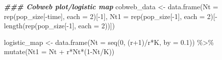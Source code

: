 \documentclass[
]{book}
\newenvironment{Shaded}{\begin{snugshade}}{\end{snugshade}}
\newcommand{\AttributeTok}[1]{\textcolor[rgb]{0.77,0.63,0.00}{#1}}
\newcommand{\DecValTok}[1]{\textcolor[rgb]{0.00,0.00,0.81}{#1}}
\newcommand{\DocumentationTok}[1]{\textcolor[rgb]{0.56,0.35,0.01}{\textbf{\textit{#1}}}}
\newcommand{\FloatTok}[1]{\textcolor[rgb]{0.00,0.00,0.81}{#1}}
\newcommand{\FunctionTok}[1]{\textcolor[rgb]{0.00,0.00,0.00}{#1}}
\newcommand{\NormalTok}[1]{#1}
\newcommand{\OtherTok}[1]{\textcolor[rgb]{0.56,0.35,0.01}{#1}}
\newcommand{\SpecialCharTok}[1]{\textcolor[rgb]{0.00,0.00,0.00}{#1}}
\begin{document}
\begin{Shaded}
\begin{Highlighting}[]
\DocumentationTok{\#\#\# Cobweb plot/logistic map}
\NormalTok{cobweb\_data }\OtherTok{\textless{}{-}} \FunctionTok{data.frame}\NormalTok{(}\AttributeTok{Nt =} \FunctionTok{rep}\NormalTok{(pop\_size[}\SpecialCharTok{{-}}\NormalTok{time], }\AttributeTok{each =} \DecValTok{2}\NormalTok{)[}\SpecialCharTok{{-}}\DecValTok{1}\NormalTok{], }
                          \AttributeTok{Nt1 =} \FunctionTok{rep}\NormalTok{(pop\_size[}\SpecialCharTok{{-}}\DecValTok{1}\NormalTok{], }\AttributeTok{each =} \DecValTok{2}\NormalTok{)[}\SpecialCharTok{{-}}\FunctionTok{length}\NormalTok{(}\FunctionTok{rep}\NormalTok{(pop\_size[}\SpecialCharTok{{-}}\DecValTok{1}\NormalTok{], }\AttributeTok{each =} \DecValTok{2}\NormalTok{))])}

\NormalTok{logistic\_map }\OtherTok{\textless{}{-}} \FunctionTok{data.frame}\NormalTok{(}\AttributeTok{Nt =} \FunctionTok{seq}\NormalTok{(}\DecValTok{0}\NormalTok{, (r}\SpecialCharTok{+}\DecValTok{1}\NormalTok{)}\SpecialCharTok{/}\NormalTok{r}\SpecialCharTok{*}\NormalTok{K, }\AttributeTok{by =} \FloatTok{0.1}\NormalTok{)) }\SpecialCharTok{\%\textgreater{}\%}
  \FunctionTok{mutate}\NormalTok{(}\AttributeTok{Nt1 =}\NormalTok{ Nt }\SpecialCharTok{+}\NormalTok{ r}\SpecialCharTok{*}\NormalTok{Nt}\SpecialCharTok{*}\NormalTok{(}\DecValTok{1}\SpecialCharTok{{-}}\NormalTok{Nt}\SpecialCharTok{/}\NormalTok{K))}


\end{Highlighting}
\end{Shaded}
\end{document}
